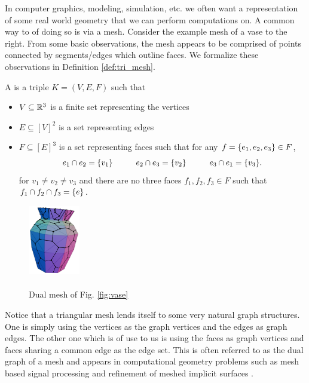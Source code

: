 \documentclass[11pt]{article}
\begin{document}
In computer graphics, modeling, simulation, etc. we often want a representation of some real world geometry that we can perform computations on. A common way to of doing so is via a mesh. Consider the example mesh of a vase to the right. From some basic observations, the mesh appears to be comprised of points connected by segments/edges which outline faces. We formalize these observations in Definition \ref{def:tri_mesh}.

\begin{definition}
    \label{def:tri_mesh}
    A  is a triple $K = (V, E, F)$ such that
    \begin{itemize}
        \item $V \subseteq \mathbb{R}^3$ is a finite set representing the vertices
        \item $E \subseteq [V]^2$ is a set representing edges
        \item $F \subseteq [E]^3$ is a set representing faces such that for any $f = \qty{e_1, e_2, e_3} \in F$, 
            \[
                e_1 \cap e_2 = \qty{v_1} \hspace{1cm} e_2 \cap e_3 = \qty{v_2} \hspace{1cm} e_3 \cap e_1 = \qty{v_3}
            .\]
            for $v_1 \neq v_2 \neq v_3$ and there are no three faces $f_1, f_2, f_3 \in F$ such that $f_1 \cap f_2 \cap f_3 = \qty{e}$.
    \end{itemize}
\end{definition}

\begin{figure}
    \vspace{-0.60cm}
    \begin{center}
        \includegraphics[width=0.20\textwidth]{figures/vase_dual.png}
    \end{center}
    \caption{\\
        Dual mesh of Fig. \ref{fig:vase}}
    \label{fig:vase_dual}
\end{figure}

Notice that a triangular mesh lends itself to some very natural graph structures. One is simply using the vertices as the graph vertices and the edges as graph edges. The other one which is of use to us is using the faces as graph vertices and faces sharing a common edge as the edge set. This is often referred to as the dual graph of a mesh and appears in computational geometry problems such as mesh based signal processing \cite{taubinDualMeshResampling2002} and refinement of meshed implicit surfaces \cite{10.1145/566282.566308}. 
\end{document}
